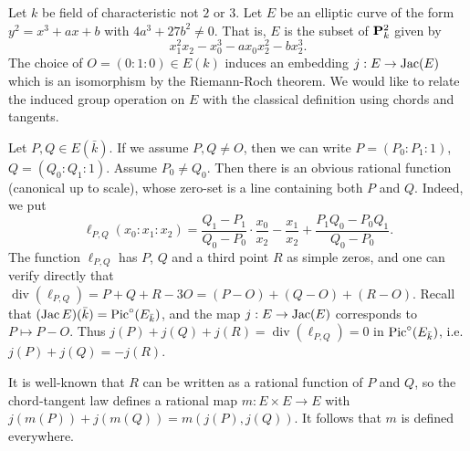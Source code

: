 \begin{example}
Let $k$ be field of characteristic not $2$ or $3$. Let $E$ be an elliptic curve 
of the form $y^2=x^3+a x+b$ with $4 a^3+27 b^2\ne 0$. That is, $E$ is the 
subset of $\mathbf{P}_k^2$ given by 
\[
  x_1^2 x_2 - x_0^3 - a x_0 x_2^2 - b x_2^3 \text{.}
\]
The choice of $O=(0:1:0)\in E(k)$ induces an embedding $j:E\to \operatorname{Jac}(E)$ which 
is an isomorphism by the Riemann-Roch theorem. We would like to relate the 
induced group operation on $E$ with the classical definition using chords and 
tangents. 

Let $P,Q\in E(\bar k)$. If we assume $P,Q\ne O$, then we can write 
$P=(P_0:P_1:1)$, $Q=(Q_0:Q_1:1)$. Assume $P_0\ne Q_0$. Then there is an obvious 
rational function (canonical up to scale), whose zero-set is a 
line containing both $P$ and $Q$. Indeed, we put 
\[
 \ell_{P,Q}(x_0:x_1:x_2) = \frac{Q_1-P_1}{Q_0-P_0} \cdot \frac{x_0}{x_2} - \frac{x_1}{x_2} + \frac{P_1 Q_0 - P_0 Q_1}{Q_0-P_0} \text{.}
\]
The function $\ell_{P,Q}$ has $P$, $Q$ and a third point $R$ as simple zeros, 
and one can verify directly that 
$\operatorname{div}(\ell_{P,Q})=P+Q+R-3 O = (P-O)+(Q-O)+(R-O)$. Recall that 
$(\operatorname{Jac} E)(\bar k)=\operatorname{Pic}^\circ(E_{\bar k})$, and the map $j:E\to \operatorname{Jac}(E)$ 
corresponds to $P\mapsto P-O$. Thus 
$j(P)+j(Q)+j(R)=\operatorname{div}(\ell_{P,Q})=0$ in 
$\operatorname{Pic}^\circ(E_{\bar k})$, i.e. $j(P)+j(Q)=-j(R)$. 

It is well-known that $R$ can be written as a rational function of $P$ and $Q$, 
so the chord-tangent law defines a rational map $m:E\times E\to E$ with 
$j(m(P))+j(m(Q))=m(j(P),j(Q))$. It follows that $m$ is defined everywhere. 
\end{example}








